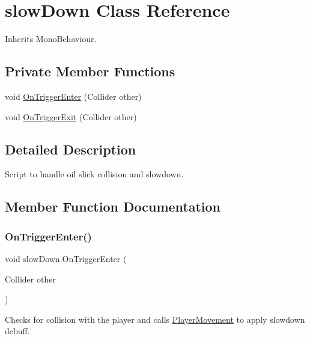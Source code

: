 \hypertarget{classslow_down}{}\section{slow\+Down Class Reference}
\label{classslow_down}


Inherits Mono\+Behaviour.

\subsection*{Private Member Functions}
\begin{DoxyCompactItemize}
\item 
void \hyperlink{classslow_down_a01f20f62208260ccb1919e378fc7a852}{On\+Trigger\+Enter} (Collider other)
\item 
void \hyperlink{classslow_down_a2761b8e6f224459dcbe3b5835b012442}{On\+Trigger\+Exit} (Collider other)
\end{DoxyCompactItemize}


\subsection{Detailed Description}
Script to handle oil slick collision and slowdown. 



\subsection{Member Function Documentation}
\mbox{\label{classslow_down_a01f20f62208260ccb1919e378fc7a852}} 
\subsubsection{\texorpdfstring{On\+Trigger\+Enter()}{OnTriggerEnter()}}
{\footnotesize\ttfamily void slow\+Down.\+On\+Trigger\+Enter (\begin{DoxyParamCaption}\item[{Collider}]{other }\end{DoxyParamCaption})\hspace{0.3cm}{\ttfamily [private]}}



Checks for collision with the player and calls \hyperlink{class_player_movement}{Player\+Movement} to apply slowdown debuff. 

